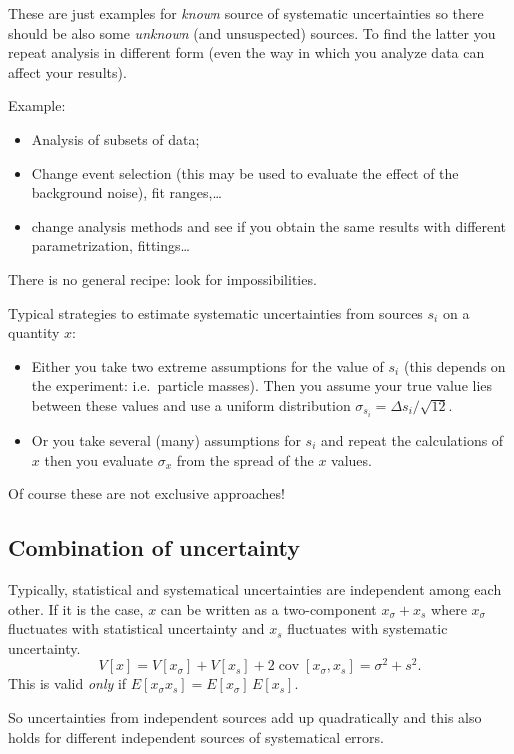 \documentclass[
	10pt,
	draft
]{scrreprt}
\DeclareMathOperator{\cov}{cov}
\begin{document}
These are just examples for \emph{known} source of systematic uncertainties so there should be also some \emph{unknown} (and unsuspected) sources.
To find the latter you repeat analysis in different form (even the way in which you analyze data can affect your results).

Example:
\begin{itemize}
	\item
Analysis of subsets of data;
	\item
Change event selection (this may be used to evaluate the effect of the background noise), fit ranges,\dots{}
	\item
change analysis methods and see if you obtain the same results with different parametrization,  fittings\dots
\end{itemize}
There is no general recipe: look for impossibilities.



Typical strategies to estimate systematic uncertainties from sources $s_i$ on a quantity $x$:
\begin{itemize}
	\item
Either you take two extreme assumptions for the value of $s_i$ (this depends on the experiment: i.e.~particle masses).
Then you assume your true value lies between these values and use a uniform distribution $\sigma_{s_i} = \Delta s_i/\sqrt{12}$.
	\item
Or you take several (many) assumptions for $s_i$ and repeat the calculations of $x$ then you evaluate $\sigma_x$ from the spread of the $x$ values.
\end{itemize}
Of course these are not exclusive approaches!



		\subsection{Combination of uncertainty}

Typically, statistical and systematical uncertainties are independent among each other.
If it is the case, $x$ can be written as a two-component $x_\sigma + x_s$ where $x_\sigma$ fluctuates with statistical uncertainty and  $x_s$ fluctuates with systematic uncertainty.
\begin{equation}
V[x] = V[x_\sigma] + V[x_s] + 2 \cov[x_\sigma,x_s] = \sigma^2 + s^2.
\end{equation}
This is valid \emph{only} if $E[x_\sigma x_s] = E[x_\sigma]\,E[x_s]$.

So uncertainties from independent sources add up quadratically and this also holds for different independent sources of systematical errors.
\end{document}
